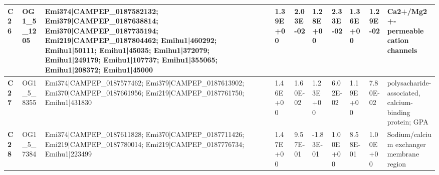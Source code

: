 \begin{landscape}
\begin{center}
\begin{footnotesize}
\begin{longtable}{|p{0.5cm}|p{1.5cm}|p{4cm}|l|l|l|l|l|l|l|}
\textbf{C26} & OG1\_5\_1205  & Emi374|CAMPEP\_0187582132; Emi379|CAMPEP\_0187638814; Emi370|CAMPEP\_0187735194; Emi219|CAMPEP\_0187804462; Emihu1|460292; Emihu1|50111; Emihu1|45035; Emihu1|372079; Emihu1|249179; Emihu1|107737; Emihu1|355065; Emihu1|208372; Emihu1|45000                                                                                                                                                                                                                                                                                                                                                                                           & 1.39E+00  & 2.03E-02 & 1.28E+00  & 2.33E-02 & 1.36E+00  & 1.29E-02 & Ca2+/Mg2+-permeable cation channels                                          \\ \hline
\textbf{C27} & OG1\_5\_8355  & Emi374|CAMPEP\_0187577462; Emi379|CAMPEP\_0187613902; Emi370|CAMPEP\_0187661956; Emi219|CAMPEP\_0187761750; Emihu1|431830                                                                                                                                                                                                                                                                                                                                                                                                                                                                                                                & 1.46E+00  & 1.60E-02 & 1.23E+00  & 6.02E-02 & 1.19E+00  & 7.80E-02 & polysacharide-associated, calcium-binding protein; GPA                       \\ \hline
\textbf{C28} & OG1\_5\_7384  & Emi374|CAMPEP\_0187611828; Emi370|CAMPEP\_0187711426; Emi219|CAMPEP\_0187780014; Emi219|CAMPEP\_0187776734; Emihu1|223499                                                                                                                                                                                                                                                                                                                                                                                                                                                                                                                & 1.47E+00  & 9.57E-01 & -1.83E-01 & 1.00E+00 & 8.58E-01  & 1.00E+00 & Sodium/calcium exchanger membrane region                                     \\ \hline

\end{longtable}
\end{footnotesize}
\end{center}
\end{landscape}
